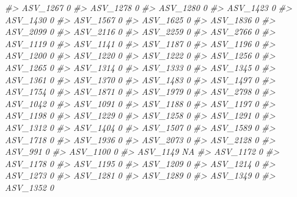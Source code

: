\documentclass[
]{article}
\newenvironment{Shaded}{\begin{snugshade}}{\end{snugshade}}
\newcommand{\CommentTok}[1]{\textcolor[rgb]{0.56,0.35,0.01}{\textit{#1}}}
\begin{document}
\begin{Shaded}
\begin{Highlighting}[]
\CommentTok{\#\textgreater{} ASV\_1267  0}
\CommentTok{\#\textgreater{} ASV\_1278  0}
\CommentTok{\#\textgreater{} ASV\_1280  0}
\CommentTok{\#\textgreater{} ASV\_1423  0}
\CommentTok{\#\textgreater{} ASV\_1430  0}
\CommentTok{\#\textgreater{} ASV\_1567  0}
\CommentTok{\#\textgreater{} ASV\_1625  0}
\CommentTok{\#\textgreater{} ASV\_1836  0}
\CommentTok{\#\textgreater{} ASV\_2099  0}
\CommentTok{\#\textgreater{} ASV\_2116  0}
\CommentTok{\#\textgreater{} ASV\_2259  0}
\CommentTok{\#\textgreater{} ASV\_2766  0}
\CommentTok{\#\textgreater{} ASV\_1119  0}
\CommentTok{\#\textgreater{} ASV\_1141  0}
\CommentTok{\#\textgreater{} ASV\_1187  0}
\CommentTok{\#\textgreater{} ASV\_1196  0}
\CommentTok{\#\textgreater{} ASV\_1200  0}
\CommentTok{\#\textgreater{} ASV\_1220  0}
\CommentTok{\#\textgreater{} ASV\_1222  0}
\CommentTok{\#\textgreater{} ASV\_1256  0}
\CommentTok{\#\textgreater{} ASV\_1265  0}
\CommentTok{\#\textgreater{} ASV\_1314  0}
\CommentTok{\#\textgreater{} ASV\_1333  0}
\CommentTok{\#\textgreater{} ASV\_1345  0}
\CommentTok{\#\textgreater{} ASV\_1361  0}
\CommentTok{\#\textgreater{} ASV\_1370  0}
\CommentTok{\#\textgreater{} ASV\_1483  0}
\CommentTok{\#\textgreater{} ASV\_1497  0}
\CommentTok{\#\textgreater{} ASV\_1754  0}
\CommentTok{\#\textgreater{} ASV\_1871  0}
\CommentTok{\#\textgreater{} ASV\_1979  0}
\CommentTok{\#\textgreater{} ASV\_2798  0}
\CommentTok{\#\textgreater{} ASV\_1042  0}
\CommentTok{\#\textgreater{} ASV\_1091  0}
\CommentTok{\#\textgreater{} ASV\_1188  0}
\CommentTok{\#\textgreater{} ASV\_1197  0}
\CommentTok{\#\textgreater{} ASV\_1198  0}
\CommentTok{\#\textgreater{} ASV\_1229  0}
\CommentTok{\#\textgreater{} ASV\_1258  0}
\CommentTok{\#\textgreater{} ASV\_1291  0}
\CommentTok{\#\textgreater{} ASV\_1312  0}
\CommentTok{\#\textgreater{} ASV\_1404  0}
\CommentTok{\#\textgreater{} ASV\_1507  0}
\CommentTok{\#\textgreater{} ASV\_1589  0}
\CommentTok{\#\textgreater{} ASV\_1718  0}
\CommentTok{\#\textgreater{} ASV\_1936  0}
\CommentTok{\#\textgreater{} ASV\_2073  0}
\CommentTok{\#\textgreater{} ASV\_2128  0}
\CommentTok{\#\textgreater{} ASV\_991   0}
\CommentTok{\#\textgreater{} ASV\_1100  0}
\CommentTok{\#\textgreater{} ASV\_1149 NA}
\CommentTok{\#\textgreater{} ASV\_1172  0}
\CommentTok{\#\textgreater{} ASV\_1178  0}
\CommentTok{\#\textgreater{} ASV\_1195  0}
\CommentTok{\#\textgreater{} ASV\_1209  0}
\CommentTok{\#\textgreater{} ASV\_1214  0}
\CommentTok{\#\textgreater{} ASV\_1273  0}
\CommentTok{\#\textgreater{} ASV\_1281  0}
\CommentTok{\#\textgreater{} ASV\_1289  0}
\CommentTok{\#\textgreater{} ASV\_1349  0}
\CommentTok{\#\textgreater{} ASV\_1352  0}

\end{Highlighting}
\end{Shaded}
\end{document}

